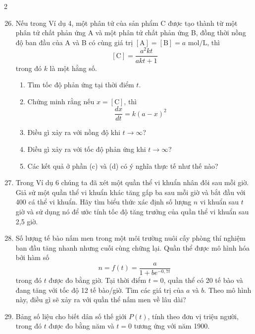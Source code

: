 \begin{multicols}{2}

\begin{enumerate}[label=\textbf{\arabic*.}, leftmargin=*, itemsep=10pt, topsep=0pt]
  \setcounter{enumi}{25}

  \item Nếu trong Ví dụ 4, một phân tử của sản phẩm C được tạo thành từ một phân tử chất phản ứng A và một phân tử chất phản ứng B, đồng thời nồng độ ban đầu của A và B có cùng giá trị $[\text{A}] = [\text{B}] = a\text{ mol/L}$, thì
  \[
  [\text{C}] = \frac{a^2kt}{akt + 1}
  \]
  trong đó $k$ là một hằng số.
  \begin{enumerate}[label=(\alph*), itemsep=2pt, topsep=2pt, leftmargin=*]
    \item Tìm tốc độ phản ứng tại thời điểm $t$.
    \item Chứng minh rằng nếu $x = [\text{C}]$, thì
    \[
    \frac{dx}{dt} = k(a - x)^2
    \]
    \item Điều gì xảy ra với nồng độ khi $t \to \infty$?
    \item Điều gì xảy ra với tốc độ phản ứng khi $t \to \infty$?
    \item Các kết quả ở phần (c) và (d) có ý nghĩa thực tế như thế nào?
  \end{enumerate}

  \item Trong Ví dụ 6 chúng ta đã xét một quần thể vi khuẩn nhân đôi sau mỗi giờ. Giả sử một quần thể vi khuẩn khác tăng gấp ba sau mỗi giờ và bắt đầu với 400 cá thể vi khuẩn. Hãy tìm biểu thức xác định số lượng $n$ vi khuẩn sau $t$ giờ và sử dụng nó để ước tính tốc độ tăng trưởng của quần thể vi khuẩn sau 2,5 giờ.

  \item Số lượng tế bào nấm men trong một môi trường nuôi cấy phòng thí nghiệm ban đầu tăng nhanh nhưng cuối cùng chững lại. Quần thể được mô hình hóa bởi hàm số
  \[
  n = f(t) = \frac{a}{1 + be^{-0{,}7t}}
  \]
  trong đó $t$ được đo bằng giờ. Tại thời điểm $t = 0$, quần thể có 20 tế bào và đang tăng với tốc độ 12 tế bào/giờ. Tìm các giá trị của $a$ và $b$. Theo mô hình này, điều gì sẽ xảy ra với quần thể nấm men về lâu dài?

  \item[\techicon~\textbf{29.}] Bảng số liệu cho biết dân số thế giới $P(t)$, tính theo đơn vị triệu người, trong đó $t$ được đo bằng năm và $t = 0$ tương ứng với năm 1900.


\end{enumerate}
\end{multicols}
